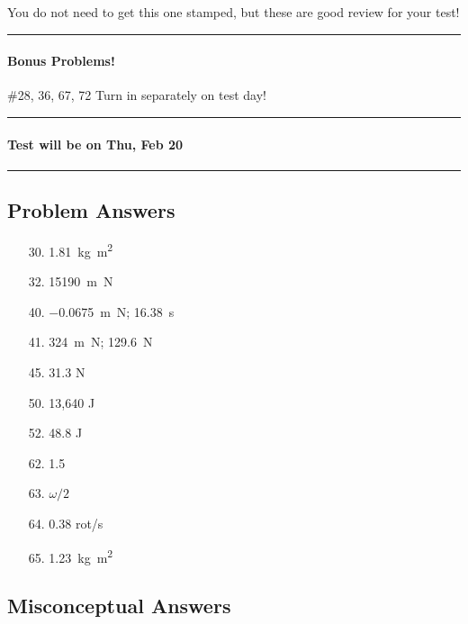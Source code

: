 \documentclass[10pt]{exam}
\begin{document}
{\sc You do not need to get this one stamped,
but these are good review for your test!}

\vspace{1em}
\hrule


\paragraph{Bonus Problems!} \#28, 36, 67, 72
\dotfill Turn in separately on test day!

\vspace{1em}
\hrule



\paragraph{Test will be on Thu, Feb 20} \hfill

\vspace{1em}

\hrule

\subsection*{Problem Answers}

\begin{multicols}{3}

  \begin{itemize}[noitemsep]
    \item[30.]  \SI{1.81}{\kilo\gram \meter^2}
    \item[32.]  \SI{15190}{\meter\newton}
    \item[40.]  
      \SI{-0.0675}{\meter\newton}; \SI{16.38}{\second}
    \item[41.]  
      \SI{324}{\meter\newton}; \SI{129.6}{\newton}
    \item[45.]  31.3 N
    \item[50.]  13,640 J
    \item[52.]  48.8 J
    \item[62.]  1.5
    \item[63.]  $\omega/2$
    \item[64.]  0.38 rot/s
    \item[65.]  \SI{1.23}{\kilo\gram\meter^2}
  \end{itemize}
  
\end{multicols}

\subsection*{Misconceptual Answers}
\end{document}
